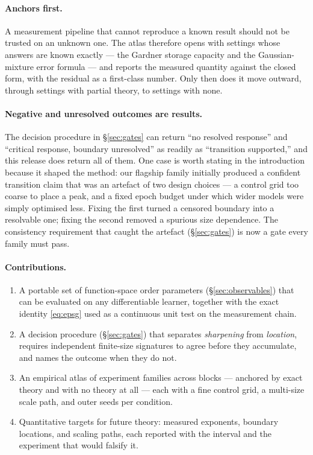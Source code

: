 \paragraph{Anchors first.}
A measurement pipeline that cannot reproduce a known result should not be
trusted on an unknown one. The atlas therefore opens with settings whose
answers are known exactly --- the Gardner storage capacity and the
Gaussian-mixture error formula --- and reports the measured quantity against
the closed form, with the residual as a first-class number. Only then does it
move outward, through settings with partial theory, to settings with none.

\paragraph{Negative and unresolved outcomes are results.}
The decision procedure in \S\ref{sec:gates} can return ``no resolved
response'' and ``critical response, boundary unresolved'' as readily as
``transition supported,'' and this release does return all of them. One case is
worth stating in the introduction because it shaped the method: our flagship
family initially produced a confident transition claim that was an artefact of
two design choices --- a control grid too coarse to place a peak, and a fixed
epoch budget under which wider models were simply optimised less. Fixing the
first turned a censored boundary into a resolvable one; fixing the second
removed a spurious size dependence. The consistency requirement that caught the
artefact (\S\ref{sec:gates}) is now a gate every family must pass.

\paragraph{Contributions.}
\begin{enumerate}
  \item A portable set of function-space order parameters
    (\S\ref{sec:observables}) that can be evaluated on any differentiable
    learner, together with the exact identity \eqref{eq:epsg} used as a
    continuous unit test on the measurement chain.
  \item A decision procedure (\S\ref{sec:gates}) that separates
    \emph{sharpening} from \emph{location}, requires independent finite-size
    signatures to agree before they accumulate, and names the outcome when they
    do not.
  \item An empirical atlas of \AtlasTotalFamilies{} experiment families across
    \AtlasTotalBlocks{} blocks --- \AtlasAnchorFamilies{} anchored by exact
    theory and \AtlasNoTheoryFamilies{} with no theory at all --- each with a
    fine control grid, a multi-size scale path, and \AtlasSpecializationSeeds{}
    outer seeds per condition.
  \item Quantitative targets for future theory: measured exponents, boundary
    locations, and scaling paths, each reported with the interval and the
    experiment that would falsify it.
\end{enumerate}


